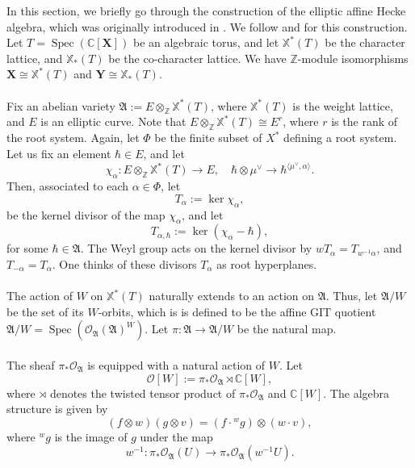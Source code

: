 \documentclass[a4paper]{report}
\theoremstyle{theorem}
\theoremstyle{definition}
\theoremstyle{remark}
\theoremstyle{proposition}
\theoremstyle{conjecture}
\theoremstyle{lemma}
\theoremstyle{corollary}
\theoremstyle{exercise}
\theoremstyle{example}
\newcommand{\C}{\mathbb{C}}
\newcommand{\mcal}{\mathcal}
\newcommand{\on}{\operatorname}
\newcommand{\spec}{\on{Spec}}
\begin{document}
  In this section, we briefly go through the construction of the elliptic affine 
  Hecke algebra, which was originally introduced in \cite{gkv95}. 
  We follow \cite[\S 4]{ZZ21} and 
  \cite[\S 4]{gkv95} for this construction.
  Let $T = \on{Spec}(\C[\mathbf{X}])$ be an 
  algebraic torus, and let $\mathbb{X}^\ast(T)$ be the character lattice,
  and $\mathbb{X}_\ast(T)$ be the co-character lattice. We have $\mathbb{Z}$-module
  isomorphisms $\mathbf{X} \cong \mathbb{X}^\ast(T)$ and $\mathbf{Y} \cong \mathbb{X}_\ast(T)$.\\\\
  Fix an abelian variety $\mathfrak{A} := E \otimes_{\mathbb{Z}} \mathbb{X}^\ast(T)$, where $\mathbb{X}^\ast(T)$ is 
  the weight lattice, and $E$ is an elliptic curve. 
  Note that $E \otimes_{\mathbb{Z}} \mathbb{X}^\ast(T) \cong E^r$, where $r$ is the rank of the root system.
  Again, let $\Phi$ be the finite subset of 
  $X^\ast$ defining a root system. Let us fix an element $\hbar \in E$, and let 
  $$\chi_\alpha : E\otimes_{\mathbb{Z}} \mathbb{X}^\ast(T) \longrightarrow E,\quad \hbar \otimes \mu^\vee \longrightarrow \hbar^{\langle\mu^\vee,\alpha\rangle}.$$
  Then, associated to each $\alpha \in \Phi$, let $$T_\alpha := \ker \chi_\alpha,$$
  be the kernel divisor of the map $\chi_\alpha$, and let 
  $$T_{\alpha,\hbar} := \ker (\chi_\alpha - \hbar),$$
  for some $\hbar \in \mathfrak{A}$.
  The Weyl group acts on the kernel divisor by $wT_\alpha = T_{w^{-1}\alpha}$, and
  $T_{-\alpha} = T_\alpha$. One thinks of these divisors $T_\alpha$ as root 
  hyperplanes.\\\\
  The action of $W$ on $\mathbb{X}^\ast(T)$ naturally extends to an action on 
  $\mathfrak{A}$. Thus, let $\mathfrak{A}/W$ be the set of its $W$-orbits, 
  which is is defined to be the affine GIT quotient
  $\mathfrak{A}/W = \spec (\mcal{O}_\mathfrak{A}(\mathfrak{A})^W)$.
  Let $\pi : \mathfrak{A} \to \mathfrak{A}/W$ be the natural map.\\\\
  The sheaf $\pi_\ast\mcal{O}_{\mathfrak{A}}$ is 
  equipped with a natural action of $W$. Let $$\mcal{O}[W] := \pi_\ast\mcal{O}_{\mathfrak{A}} \rtimes \C[W],$$ where $\rtimes$ denotes the 
  twisted tensor product of $\pi_\ast\mcal{O}_{\mathfrak{A}}$ and $\C[W]$. 
  The algebra structure is given by
  $$(f\otimes w)(g \otimes v) = (f \cdot {}^wg)\otimes (w\cdot v),$$
  where ${}^wg$ is the image of $g$ under the map 
  $$w^{-1} : \pi_\ast\mcal{O}_{\mathfrak{A}}(U) \longrightarrow \pi_\ast\mcal{O}_{\mathfrak{A}}(w^{-1}U).$$
\end{document}
